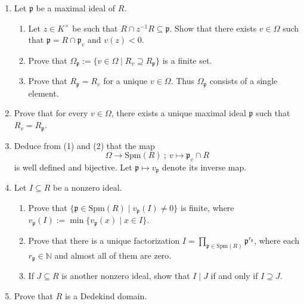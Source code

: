 \documentclass[12pt, a4paper]{article}
\begin{document}
\begin{enumerate}
    \item Let $\mathfrak{p}$ be a maximal ideal of $R$.
    \begin{enumerate}
        \item Let $z \in K^\times$ be such that $R \cap z^{-1}R \subseteq \mathfrak{p}$. Show that there exists $v \in \Omega$ such that $\mathfrak{p} = R \cap \mathfrak{p}_v$ and $v(z) < 0$.
        \item Prove that $\Omega_{\mathfrak{p}} := \{v \in \Omega \mid R_v \supseteq R_{\mathfrak{p}}\}$ is a finite set.
        \item Prove that $R_{\mathfrak{p}} = R_v$ for a unique $v \in \Omega$. Thus $\Omega_{\mathfrak{p}}$ consists of a single element.
    \end{enumerate}
    
    \item Prove that for every $v \in \Omega$, there exists a unique maximal ideal $\mathfrak{p}$ such that $R_v = R_{\mathfrak{p}}$.
    
    \item Deduce from (1) and (2) that the map
    \[ \Omega \longrightarrow \text{Spm}(R) \ ; \ v \longmapsto \mathfrak{p}_v \cap R \]
    is well defined and bijective. Let $\mathfrak{p} \mapsto v_{\mathfrak{p}}$ denote its inverse map.
    
    \item Let $I \subseteq R$ be a nonzero ideal.
    \begin{enumerate}
        \item Prove that $\{\mathfrak{p} \in \text{Spm}(R) \mid v_{\mathfrak{p}}(I) \neq 0\}$ is finite, where $v_{\mathfrak{p}}(I) := \min\{v_{\mathfrak{p}}(x) \mid x \in I\}$.
        \item Prove that there is a unique factorization $I = \prod_{\mathfrak{p} \in \text{Spm}(R)} \mathfrak{p}^{r_{\mathfrak{p}}}$, where each $r_{\mathfrak{p}} \in \mathbb{N}$ and almost all of them are zero.
        \item If $J \subseteq R$ is another nonzero ideal, show that $I \mid J$ if and only if $I \supseteq J$.
    \end{enumerate}
    
    \item Prove that $R$ is a Dedekind domain.
\end{enumerate}
\end{document}
